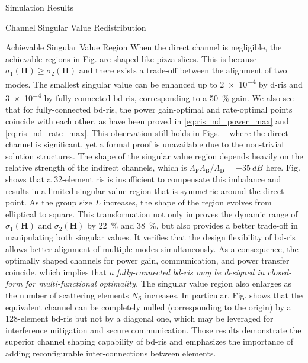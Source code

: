 \documentclass[journal]{IEEEtran}
\begin{document}
\begin{section}{Simulation Results}
\begin{subsection}{Channel Singular Value Redistribution}
\begin{subsubsection}{Achievable Singular Value Region}
			When the direct channel is negligible, the achievable regions in Fig.  are shaped like pizza slices.
			This is because $\sigma_1(\mathbf{H}) \ge \sigma_2(\mathbf{H})$ and there exists a trade-off between the alignment of two modes.
			The smallest singular value can be enhanced up to \num{2e-4} by \gls{d}-\gls{ris} and \num{3e-4} by fully-connected \gls{bd}-\gls{ris}, corresponding to a \qty{50}{\percent} gain.
			We also see that for fully-connected \gls{bd}-\gls{ris}, the power gain-optimal and rate-optimal points coincide with each other, as have been proved in  \eqref{eq:ris_nd_power_max} and \eqref{eq:ris_nd_rate_max}.
			This observation still holds in Figs.  --  where the direct channel is significant, yet a formal proof is unavailable due to the non-trivial solution structures.
			The shape of the singular value region depends heavily on the relative strength of the indirect channels, which is $\Lambda_\mathrm{F}\Lambda_\mathrm{B}/\Lambda_\mathrm{D}=\qty{-35}{dB}$ here.
			Fig.  shows that a 32-element \gls{ris} is insufficient to compensate this imbalance and results in a limited singular value region that is symmetric around the direct point.
			As the group size $L$ increases, the shape of the region evolves from elliptical to square.
			This transformation not only improves the dynamic range of $\sigma_1(\mathbf{H})$ and $\sigma_2(\mathbf{H})$ by \qty{22}{\percent} and \qty{38}{\percent}, but also provides a better trade-off in manipulating both singular values.
			It verifies that the design flexibility of \gls{bd}-\gls{ris} allows better alignment of multiple modes simultaneously.
			As a consequence, {the optimally shaped channels for power gain, communication, and power transfer coincide,} which implies that \emph{a fully-connected \gls{bd}-\gls{ris} may be designed in closed-form for multi-functional optimality.}
			The singular value region also enlarges as the number of scattering elements $N_\mathrm{S}$ increases.
			In particular, Fig.  shows that the equivalent channel can be completely nulled (corresponding to the origin) by a 128-element \gls{bd}-\gls{ris} but not by a diagonal one, which may be leveraged for interference mitigation and secure communication.
			Those results demonstrate the superior channel shaping capability of \gls{bd}-\gls{ris} and emphasizes the importance of adding reconfigurable inter-connections between elements.
		\end{subsubsection}


\end{subsection}
\end{section}
\end{document}
